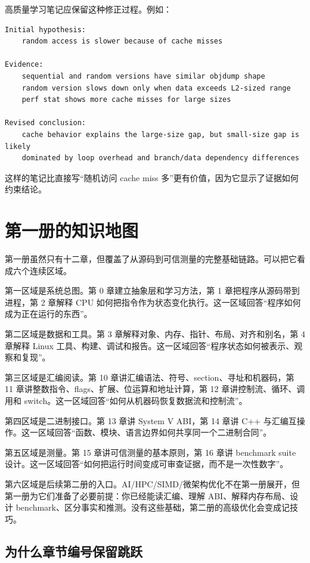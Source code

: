 高质量学习笔记应保留这种修正过程。例如：

\begin{lstlisting}
Initial hypothesis:
    random access is slower because of cache misses

Evidence:
    sequential and random versions have similar objdump shape
    random version slows down only when data exceeds L2-sized range
    perf stat shows more cache misses for large sizes

Revised conclusion:
    cache behavior explains the large-size gap, but small-size gap is likely
    dominated by loop overhead and branch/data dependency differences
\end{lstlisting}

这样的笔记比直接写“随机访问 cache miss 多”更有价值，因为它显示了证据如何约束结论。

\section{第一册的知识地图}

第一册虽然只有十二章，但覆盖了从源码到可信测量的完整基础链路。可以把它看成六个连续区域。

第一区域是系统总图。第 0 章建立抽象层和学习方法，第 1 章把程序从源码带到进程，第 2 章解释 CPU 如何把指令作为状态变化执行。这一区域回答“程序如何成为正在运行的东西”。

第二区域是数据和工具。第 3 章解释对象、内存、指针、布局、对齐和别名，第 4 章解释 Linux 工具、构建、调试和报告。这一区域回答“程序状态如何被表示、观察和复现”。

第三区域是汇编阅读。第 10 章讲汇编语法、符号、section、寻址和机器码，第 11 章讲整数指令、flags、扩展、位运算和地址计算，第 12 章讲控制流、循环、调用和 switch。这一区域回答“如何从机器码恢复数据流和控制流”。

第四区域是二进制接口。第 13 章讲 System V ABI，第 14 章讲 C++ 与汇编互操作。这一区域回答“函数、模块、语言边界如何共享同一个二进制合同”。

第五区域是测量。第 15 章讲可信测量的基本原则，第 16 章讲 benchmark suite 设计。这一区域回答“如何把运行时间变成可审查证据，而不是一次性数字”。

第六区域是后续第二册的入口。AI/HPC/SIMD/微架构优化不在第一册展开，但第一册为它们准备了必要前提：你已经能读汇编、理解 ABI、解释内存布局、设计 benchmark、区分事实和推测。没有这些基础，第二册的高级优化会变成记技巧。

\subsection{为什么章节编号保留跳跃}

